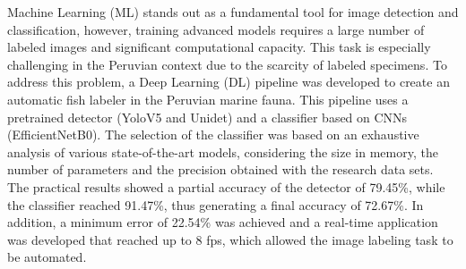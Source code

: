 Machine Learning (ML) stands out as a fundamental tool for 
image detection and classification, however, training 
advanced models requires a large number of labeled images 
and significant computational capacity. This task is especially 
challenging in the Peruvian context due to the scarcity of labeled 
specimens. To address this problem, a Deep Learning (DL) pipeline 
was developed to create an automatic fish labeler in the Peruvian 
marine fauna. This pipeline uses a pretrained detector (YoloV5 and 
Unidet) and a classifier based on CNNs (EfficientNetB0). The 
selection of the classifier was based on an exhaustive analysis of 
various state-of-the-art models, considering the size in memory, 
the number of parameters and the precision obtained with the 
research data sets. The practical results showed a partial accuracy 
of the detector of 79.45\%, while the classifier reached 91.47\%, 
thus generating a final accuracy of 72.67\%. In addition, a minimum 
error of 22.54\% was achieved and a real-time application was developed 
that reached up to 8 fps, which allowed the image labeling task to be 
automated.